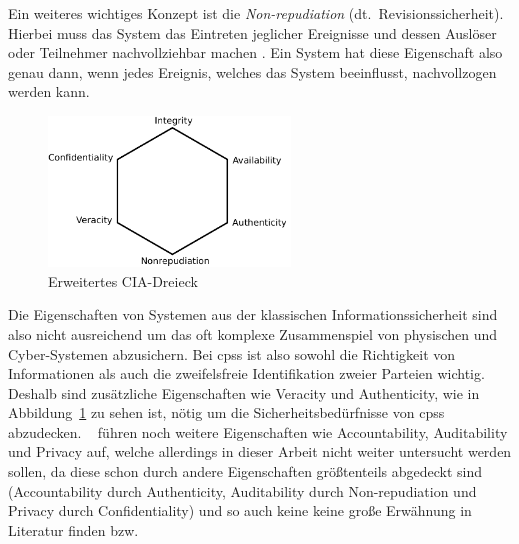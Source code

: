 \documentclass[final,bibliography=totocnumbered]{include/sikseminar}
\newcommand{\cps}{\glspl{cps}\xspace}
\begin{document}
    Ein weiteres wichtiges Konzept ist die \textit{Non-repudiation} (dt.\ Revisionssicherheit).
    Hierbei muss das System das Eintreten jeglicher Ereignisse und dessen Auslöser oder Teilnehmer nachvollziehbar machen \cite{CH13}.
    Ein System hat diese Eigenschaft also genau dann, wenn jedes Ereignis, welches das System beeinflusst, nachvollzogen werden kann.

    \begin{figure}[h]
        \centering
        \includegraphics[height=4cm]{triad}
        \caption{Erweitertes CIA-Dreieck}
        \label{fig:triad}
    \end{figure}

    Die Eigenschaften von Systemen aus der klassischen Informationssicherheit sind also nicht ausreichend um das oft komplexe Zusammenspiel von physischen und Cyber-Systemen abzusichern.
    Bei \cps ist also sowohl die Richtigkeit von Informationen als auch die zweifelsfreie Identifikation zweier Parteien wichtig.
    Deshalb sind zusätzliche Eigenschaften wie Veracity und Authenticity, wie in Abbildung~\ref{fig:triad} zu sehen ist, nötig um die Sicherheitsbedürfnisse von \cps abzudecken.
    \citeauthor{CH13}~\cite{CH13} führen noch weitere Eigenschaften wie Accountability, Auditability und Privacy auf, welche allerdings in dieser Arbeit nicht weiter untersucht werden sollen, da diese schon durch andere Eigenschaften größtenteils abgedeckt sind (Accountability durch Authenticity, Auditability durch Non-repudiation und Privacy durch Confidentiality) und so auch keine keine große Erwähnung in Literatur finden bzw.
\end{document}
